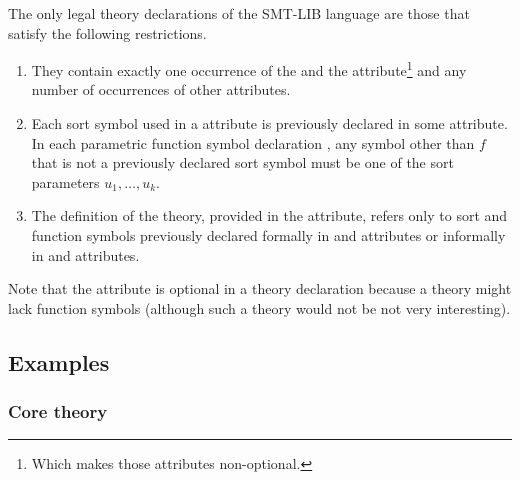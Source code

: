 \begin{constraint}
\label{def:theory}
The only legal theory declarations of the SMT-LIB language are those 
that satisfy the following restrictions.
\begin{enumerate}
\item
They contain exactly one occurrence of the  and 
the  attribute\footnote{%
Which makes those attributes non-optional.
}
and any number of occurrences of other attributes.

\item
Each sort symbol used in a  attribute is 
previously declared in some  attribute.
In each parametric function symbol declaration
,
any symbol other than $f$ that is not a previously declared sort symbol
must be one of the sort parameters $u_1, \ldots, u_k$. 

\item
The definition of the theory, provided in the  attribute,
refers only to sort and function symbols previously declared formally
in  and  attributes or 
informally in  and  attributes.

\end{enumerate}
\end{constraint}

Note that the  attribute is optional in a theory declaration
because a theory might lack function symbols (although 
such a theory would not be not very interesting).


\subsection{Examples} \label{sec:theory-examples}

\subsubsection*{Core theory}

